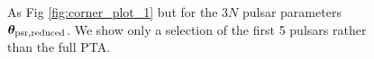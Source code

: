 \documentclass[fleqn,usenatbib,useAMS]{mnras}
\begin{document}
\begin{figure}%
	\centering
	\qquad
	\qquad
	
	\caption{As Fig \ref{fig:corner_plot_1} but for the $3N$ pulsar parameters $\boldsymbol{\theta}_{\rm psr, reduced}$. We show only a selection of the first 5 pulsars rather than the full PTA.}
	\label{fig:example}%
\end{figure}








%
%
%
%
%
%
%
%
\end{document}
